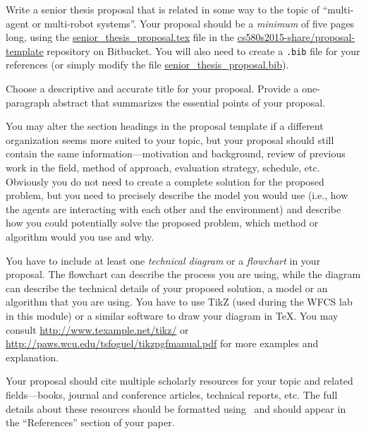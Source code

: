 

\usepackage{ulem}
\usepackage[compact]{titlesec}




Write a senior thesis proposal that is related in some way to the topic of ``multi-agent or multi-robot systems''. Your
proposal should be a {\em minimum} of five pages long, using the \url{senior_thesis_proposal.tex} file in the
\url{cs580s2015-share/proposal-template} repository on Bitbucket.  You will also need to create a {\tt .bib} file for
your references (or simply modify the file \url{senior_thesis_proposal.bib}).

Choose a descriptive and accurate title for your proposal. Provide a one-paragraph abstract that summarizes the
essential points of your proposal.

You may alter the section headings in the proposal template if a different organization seems more suited to your topic,
but your proposal should still contain the same information---motivation and background, review of previous work in the
field, method of approach, evaluation strategy, schedule, etc. Obviously you do not need to create a complete solution
for the proposed problem, but you need to precisely describe the model you would use (i.e., how the agents are
interacting with each other and the environment) and describe how you could potentially solve the proposed problem,
which method or algorithm would you use and why.

You have to include at least one {\em technical diagram} or a {\em flowchart} in your proposal. The flowchart can
describe the process you are using, while the diagram can describe the technical details of your proposed solution, a
model or an algorithm that you are using. You have to use TikZ (used during the WFCS lab in this module) or a similar
software to draw your diagram in \TeX. You may consult \url{http://www.texample.net/tikz/} or
\url{http://paws.wcu.edu/tsfoguel/tikzpgfmanual.pdf} for more examples and explanation.

Your proposal should cite multiple scholarly resources for your topic and related fields---books, journal and conference
articles, technical reports, etc. The full details about these resources should be formatted using \BibTeX\ and should
appear in the ``References'' section of your paper.

